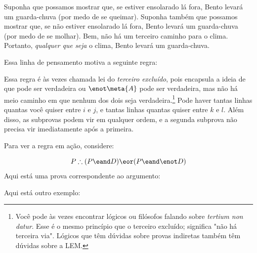 Suponha que possamos mostrar que, se estiver ensolarado lá fora, Bento levará um guarda-chuva (por medo de se queimar). Suponha   também que possamos mostrar que, se não estiver ensolarado lá fora, Bento levará um guarda-chuva (por medo de se molhar). Bem, não há um terceiro caminho para o clima. Portanto, \emph{qualquer que seja}   o clima, Bento levará um guarda-chuva.

Essa linha de pensamento motiva a seguinte regra:

 Essa regra   é  às vezes   chamada lei do  \emph{terceiro excluído}, pois encapsula a ideia de que  pode ser verdadeira ou $\enot \meta{A}$ pode ser verdadeira, mas não há meio caminho em que nenhum dos dois seja verdadeira.\footnote{Você pode às vezes encontrar lógicos ou filósofos falando sobre \emph{tertium non datur}. Esse é o mesmo princípio que o terceiro excluído; significa "não há terceira via". Lógicos que têm dúvidas sobre provas indiretas também têm dúvidas sobre a LEM.} Pode haver tantas linhas quantas você quiser entre $i$ e $j$, e tantas linhas quantas quiser entre $k$ e $l$.  Além disso, as subprovas podem vir em qualquer ordem, e a segunda subprova não precisa vir imediatamente após a primeira.

Para ver a regra em ação, considere:
 
	$$P \therefore (P \eand D) \eor (P \eand \enot D)$$
Aqui está uma prova correspondente ao argumento:
	\begin{fitchproof}
		\open
		\close
		\open
		\close
	\end{fitchproof}
Aqui está outro exemplo:
\begin{fitchproof}
	\hypo{ana}{A \eif \enot A}
	\open
		\hypo{a}{A}
		\ce{ana, a}
	\close
	\open
		\hypo{na1}{\enot A}
		\by{R}{na1}
	\close
	\tnd{a-na, na1-na2}
\end{fitchproof}

